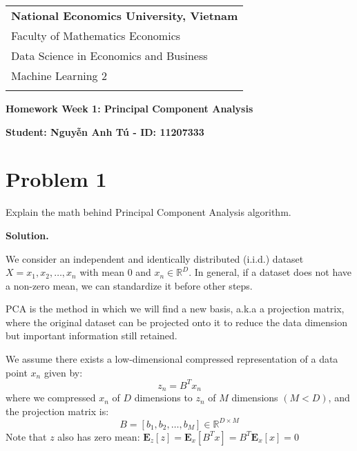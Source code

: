 \documentclass[a4paper, 12pt]{article}  %
\begin{document}
\thispagestyle{empty} %

\begin{tabular}{p{12.5cm}} %
{\large \bf National Economics University, Vietnam} \\
Faculty of Mathematics Economics \\ Data Science in Economics and Business  \\ Machine Learning 2\\
\hline %
\\
\end{tabular} %

\vspace*{0.3cm} %

\begin{center} %
	{\Large \bf Homework Week 1: Principal Component Analysis}
	\vspace{2mm}
	
	{\bf Student: Nguyễn Anh Tú - ID: 11207333} %
\end{center}  

\section*{Problem 1}

Explain the math behind Principal Component Analysis algorithm.

\textbf{Solution.}

We consider an independent and identically distributed (i.i.d.) dataset $X
= {x_1, x_2, \hdots, x_n}$ with mean 0 and $x_n \in \mathbb{R}^D$. In general, if a dataset does not have a non-zero mean, we can standardize it before other steps.

PCA is the method in which we will find a new basis, a.k.a a projection matrix, where the original dataset can be projected onto it to reduce the data dimension but important information still retained.

We assume there exists a low-dimensional compressed representation of a data point $x_n$ given by:
\[z_n = B^T x_n\]
where we compressed $x_n$ of $D$ dimensions to $z_n$ of $M$ dimensions $(M < D)$, and the projection matrix is:
\[B = [b_1, b_2, \hdots, b_M] \in \mathbb{R}^{D \times M}\]
Note that $z$ also has zero mean: \(\mathbf{E}_z[z] = \mathbf{E}_x[B^T x] = B^T \mathbf{E}_x[x] = 0\)
\end{document}

